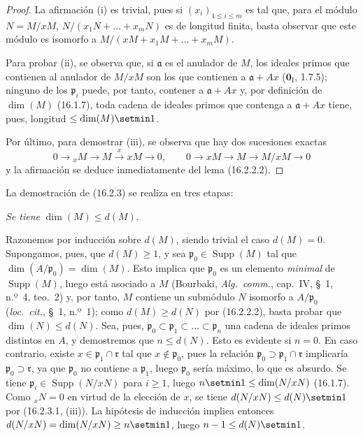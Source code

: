 \begin{proof}
La afirmación (i) es trivial, pues si $(x_i)_{1\leq i\leq m}$ es tal que, para
el módulo $N=M/xM$, $N/(x_1N+\ldots+x_mN)$ es de longitud finita, basta
observar que este módulo es isomorfo a
$M/(xM+x_1M+\ldots+x_mM)$.

Para probar (ii), se observa que, si $\mathfrak{a}$ es el anulador de $M$, los
ideales primos que contienen al anulador de $M/xM$ son los que contienen a
$\mathfrak{a}+Ax$ ($\mathbf{0}_{\mathrm I}$, 1.7.5); ninguno de los
$\mathfrak{p}_i$ puede, por tanto, contener a $\mathfrak{a}+Ax$ y, por
definición de $\dim(M)$ (16.1.7), toda cadena de ideales primos que contenga a
$\mathfrak{a}+Ax$ tiene, pues, longitud $\leq\dim(M)\setmin 1$.


Por último, para demostrar (iii), se observa que hay dos sucesiones exactas
\[
  0\to{}_xM\to M\xrightarrow{x}xM\to0,\qquad
  0\to xM\to M\to M/xM\to0
\]
y la afirmación se deduce inmediatamente del lema (16.2.2.2).
\end{proof}

La demostración de (16.2.3) se realiza en tres etapas:

\begin{env}[16.2.3.2]
\label{0.16.2.3.2-es}
\emph{Se tiene} $\dim(M)\leq d(M)$.
\end{env}

Razonemos por inducción sobre $d(M)$, siendo trivial el caso $d(M)=0$.
Supongamos, pues, que $d(M)\geq1$, y sea
$\mathfrak{p}_0\in\operatorname{Supp}(M)$ tal que
$\dim(A/\mathfrak{p}_0)=\dim(M)$. Esto implica que $\mathfrak{p}_0$ es un
elemento \emph{minimal} de $\operatorname{Supp}(M)$, luego está asociado a $M$
(Bourbaki, \emph{Alg.~comm.}, cap.~IV, \S~1, n.º~4, teo.~2) y, por tanto, $M$
contiene un submódulo $N$ isomorfo a $A/\mathfrak{p}_0$ (\emph{loc.~cit.},
\S~1, n.º~1); como $d(M)\geq d(N)$ por (16.2.2.2), basta probar que
$\dim(N)\leq d(N)$. Sea, pues,
$\mathfrak{p}_0\subset\mathfrak{p}_1\subset\ldots\subset\mathfrak{p}_n$ una
cadena de ideales primos distintos en $A$, y demostremos que $n\leq d(N)$.
Esto es evidente si $n=0$. En caso contrario, existe
$x\in\mathfrak{p}_1\cap\mathfrak{r}$ tal que $x\notin\mathfrak{p}_0$, pues la
relación $\mathfrak{p}_0\supset\mathfrak{p}_1\cap\mathfrak{r}$ implicaría
$\mathfrak{p}_0\supset\mathfrak{r}$, ya que $\mathfrak{p}_0$ no contiene a
$\mathfrak{p}_1$, luego $\mathfrak{p}_0$ sería máximo, lo que es absurdo.
Se tiene $\mathfrak{p}_i\in\operatorname{Supp}(N/xN)$ para $i\geq1$, luego
$n\setmin 1\leq\dim(N/xN)$ (16.1.7). Como ${}_xN=0$ en virtud de la elección de $x$,
se tiene $d(N/xN)\leq d(N)\setmin 1$ por (16.2.3.1, (iii)). La hipótesis de inducción
implica entonces $d(N/xN)=\dim(N/xN)\geq n\setmin 1$, luego
$n-1\leq d(N)\setmin 1$.

